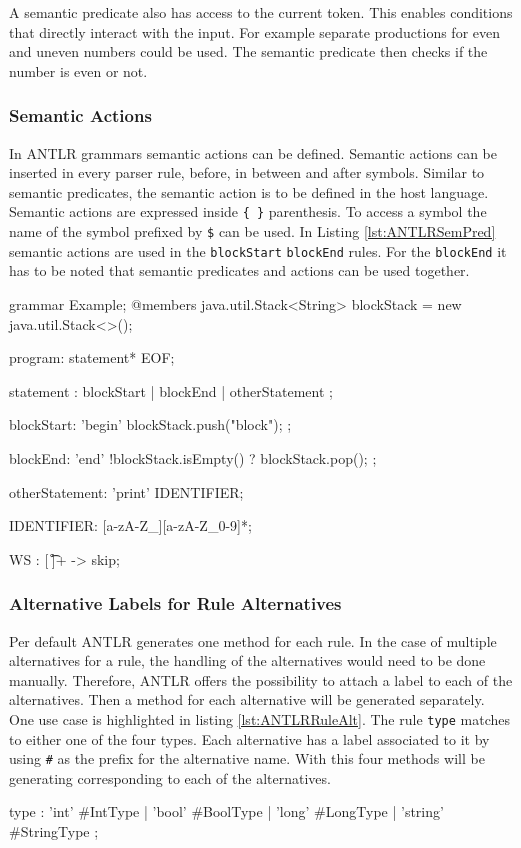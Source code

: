 A semantic predicate also has access to the current token. This enables conditions that directly interact with the input. For example separate productions for even and uneven numbers could be used. The semantic predicate then checks if the number is even or not.  


\subsubsection{Semantic Actions}

In ANTLR grammars semantic actions can be defined. Semantic actions can be inserted in every parser rule, before, in between and after symbols. Similar to semantic predicates, the semantic action is to be defined in the host language. Semantic actions are expressed inside \verb|{ }| parenthesis. To access a symbol the name of the symbol prefixed by \verb|$| can be used. In Listing \ref{lst:ANTLRSemPred} semantic actions are used in the \texttt{blockStart} \texttt{blockEnd} rules. For the \texttt{blockEnd} it has to be noted that semantic predicates and actions can be used together. 


\begin{GenericCode}[float,numbers=none,caption=Example grammar using a semantic predicate and a semantic action., label=lst:ANTLRSemPred]
grammar Example;
@members {
    java.util.Stack<String> blockStack = new java.util.Stack<>();
}

program: statement* EOF;

statement
    : blockStart
    | blockEnd
    | otherStatement
    ;

blockStart: 'begin' { blockStack.push("block"); };

blockEnd: 'end' { !blockStack.isEmpty() }? { blockStack.pop(); };

otherStatement: 'print' IDENTIFIER;

IDENTIFIER: [a-zA-Z_][a-zA-Z_0-9]*;

WS  : [ \t\r\n]+ -> skip;
\end{GenericCode}


\subsubsection{Alternative Labels for Rule Alternatives}

Per default ANTLR generates one method for each rule. In the case of multiple alternatives for a rule, the handling of the alternatives would need to be done manually. Therefore, ANTLR offers the possibility to attach a label to each of the alternatives. Then a method for each alternative will be generated separately. One use case is highlighted in listing \ref{lst:ANTLRRuleAlt}. The rule \texttt{type} matches to either one of the four types. Each alternative has a label associated to it by using \verb|#| as the prefix for the alternative name. With this four methods will be generating corresponding to each of the alternatives.     

\begin{GenericCode}[float,numbers=none,caption=Example rule using alternative labels for the rule alternatives., label=lst:ANTLRRuleAlt]
  type
      : 'int'     #IntType
      | 'bool'    #BoolType
      | 'long'    #LongType
      | 'string'  #StringType
      ;
  \end{GenericCode}